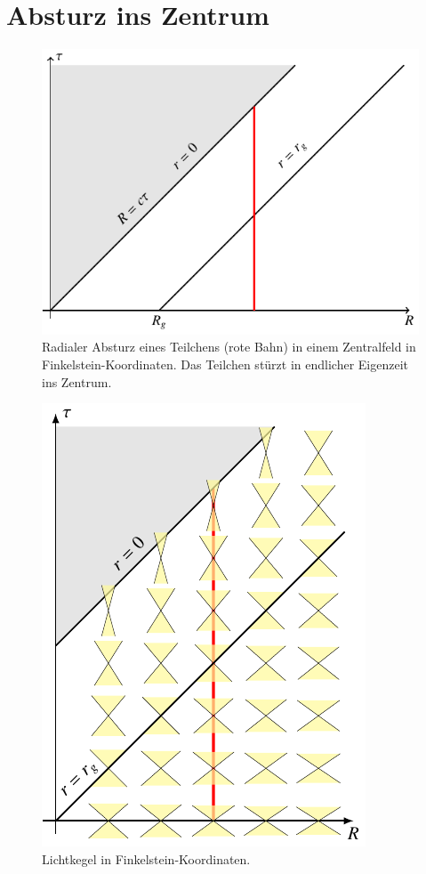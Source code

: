 \section{Absturz ins Zentrum}
\begin{figure}
\centering
\includegraphics{chapters/tikz/absturz.pdf}
\caption{Radialer Absturz eines Teilchens (rote Bahn) in einem Zentralfeld
in Finkelstein-Koordinaten.
Das Teilchen stürzt in endlicher Eigenzeit ins Zentrum.
\label{skript:kruemmung:fig:absturz}}
\end{figure}
\begin{figure}
\centering
\includegraphics{chapters/tikz/lichtkegel.pdf}
\caption{Lichtkegel in Finkelstein-Koordinaten.
\label{skript:kruemmung:fig:lichtkegel}}
\end{figure}
